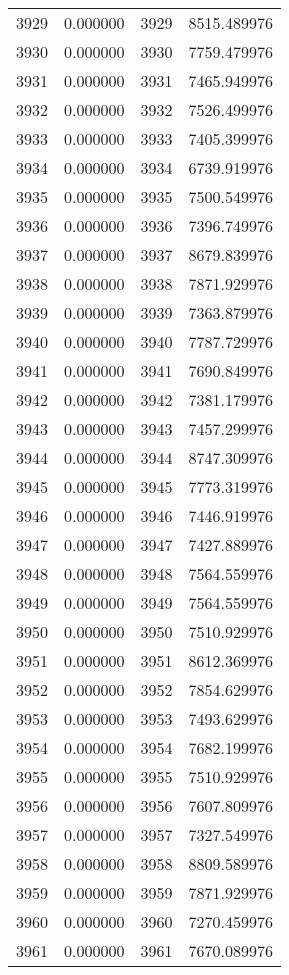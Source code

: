 \documentclass[12pt]{article}
\begin{document}
\begin{longtable}{@{}cccc@{}}
3929 & 0.000000 & 3929 & 8515.489976 \\
3930 & 0.000000 & 3930 & 7759.479976 \\
3931 & 0.000000 & 3931 & 7465.949976 \\
3932 & 0.000000 & 3932 & 7526.499976 \\
3933 & 0.000000 & 3933 & 7405.399976 \\
3934 & 0.000000 & 3934 & 6739.919976 \\
3935 & 0.000000 & 3935 & 7500.549976 \\
3936 & 0.000000 & 3936 & 7396.749976 \\
3937 & 0.000000 & 3937 & 8679.839976 \\
3938 & 0.000000 & 3938 & 7871.929976 \\
3939 & 0.000000 & 3939 & 7363.879976 \\
3940 & 0.000000 & 3940 & 7787.729976 \\
3941 & 0.000000 & 3941 & 7690.849976 \\
3942 & 0.000000 & 3942 & 7381.179976 \\
3943 & 0.000000 & 3943 & 7457.299976 \\
3944 & 0.000000 & 3944 & 8747.309976 \\
3945 & 0.000000 & 3945 & 7773.319976 \\
3946 & 0.000000 & 3946 & 7446.919976 \\
3947 & 0.000000 & 3947 & 7427.889976 \\
3948 & 0.000000 & 3948 & 7564.559976 \\
3949 & 0.000000 & 3949 & 7564.559976 \\
3950 & 0.000000 & 3950 & 7510.929976 \\
3951 & 0.000000 & 3951 & 8612.369976 \\
3952 & 0.000000 & 3952 & 7854.629976 \\
3953 & 0.000000 & 3953 & 7493.629976 \\
3954 & 0.000000 & 3954 & 7682.199976 \\
3955 & 0.000000 & 3955 & 7510.929976 \\
3956 & 0.000000 & 3956 & 7607.809976 \\
3957 & 0.000000 & 3957 & 7327.549976 \\
3958 & 0.000000 & 3958 & 8809.589976 \\
3959 & 0.000000 & 3959 & 7871.929976 \\
3960 & 0.000000 & 3960 & 7270.459976 \\
3961 & 0.000000 & 3961 & 7670.089976 \\

\end{longtable}
\end{document}
